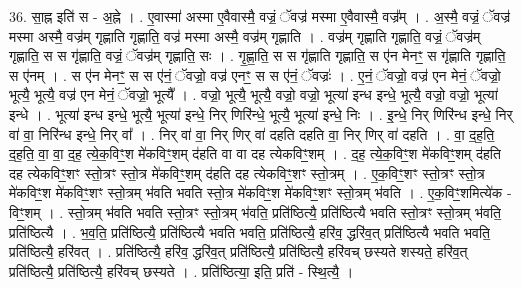 \documentclass[17pt]{extarticle}
\begin{document}
36. सा॒ह्न इति॑ स - अ॒ह्ने । . ए॒वास्मा॑ अस्मा ए॒वैवास्मै॒ वज्रं॒ ॅवज्र॑ मस्मा ए॒वैवास्मै॒ वज्र᳚म् । . अ॒स्मै॒ वज्रं॒ ॅवज्र॑ मस्मा अस्मै॒ वज्र॑म् गृह्णाति गृह्णाति॒ वज्र॑ मस्मा अस्मै॒ वज्र॑म् गृह्णाति । . वज्र॑म् गृह्णाति गृह्णाति॒ वज्रं॒ ॅवज्र॑म् गृह्णाति॒ स स गृ॑ह्णाति॒ वज्रं॒ ॅवज्र॑म् गृह्णाति॒ सः । . गृ॒ह्णा॒ति॒ स स गृ॑ह्णाति गृह्णाति॒ स ए॑न मेनꣳ॒॒ स गृ॑ह्णाति गृह्णाति॒ स ए॑नम् । . स ए॑न मेनꣳ॒॒ स स ए॑नं॒ ॅवज्रो॒ वज्र॑ एनꣳ॒॒ स स ए॑नं॒ ॅवज्रः॑ । . ए॒नं॒ ॅवज्रो॒ वज्र॑ एन मेनं॒ ॅवज्रो॒ भूत्यै॒ भूत्यै॒ वज्र॑ एन मेनं॒ ॅवज्रो॒ भूत्यै᳚ । . वज्रो॒ भूत्यै॒ भूत्यै॒ वज्रो॒ वज्रो॒ भूत्या॑ इन्ध इन्धे॒ भूत्यै॒ वज्रो॒ वज्रो॒ भूत्या॑ इन्धे । . भूत्या॑ इन्ध इन्धे॒ भूत्यै॒ भूत्या॑ इन्धे॒ निर् णिरि॑न्धे॒ भूत्यै॒ भूत्या॑ इन्धे॒ निः । . इ॒न्धे॒ निर् णिरि॑न्ध इन्धे॒ निर् वा॑ वा॒ निरि॑न्ध इन्धे॒ निर् वा᳚ । . निर् वा॑ वा॒ निर् णिर् वा॑ दहति दहति वा॒ निर् णिर् वा॑ दहति । . वा॒ द॒ह॒ति॒ द॒ह॒ति॒ वा॒ वा॒ द॒ह॒ त्ये॒क॒विꣳ॒॒श मे॑कविꣳ॒॒शम् द॑हति वा वा दह त्येकविꣳ॒॒शम् । . द॒ह॒ त्ये॒क॒विꣳ॒॒श मे॑कविꣳ॒॒शम् द॑हति दह त्येकविꣳ॒॒शꣳ स्तो॒त्रꣳ स्तो॒त्र मे॑कविꣳ॒॒शम् द॑हति दह त्येकविꣳ॒॒शꣳ स्तो॒त्रम् । . ए॒क॒विꣳ॒॒शꣳ स्तो॒त्रꣳ स्तो॒त्र मे॑कविꣳ॒॒श मे॑कविꣳ॒॒शꣳ स्तो॒त्रम् भ॑वति भवति स्तो॒त्र मे॑कविꣳ॒॒श मे॑कविꣳ॒॒शꣳ स्तो॒त्रम् भ॑वति । . ए॒क॒विꣳ॒॒शमित्ये॑क - विꣳ॒॒शम् । . स्तो॒त्रम् भ॑वति भवति स्तो॒त्रꣳ स्तो॒त्रम् भ॑वति॒ प्रति॑ष्ठित्यै॒ प्रति॑ष्ठित्यै भवति स्तो॒त्रꣳ स्तो॒त्रम् भ॑वति॒ प्रति॑ष्ठित्यै । . भ॒व॒ति॒ प्रति॑ष्ठित्यै॒ प्रति॑ष्ठित्यै भवति भवति॒ प्रति॑ष्ठित्यै॒ हरि॑व॒ द्धरि॑व॒त् प्रति॑ष्ठित्यै भवति भवति॒ प्रति॑ष्ठित्यै॒ हरि॑वत् । . प्रति॑ष्ठित्यै॒ हरि॑व॒ द्धरि॑व॒त् प्रति॑ष्ठित्यै॒ प्रति॑ष्ठित्यै॒ हरि॑वच् छस्यते शस्यते॒ हरि॑व॒त् प्रति॑ष्ठित्यै॒ प्रति॑ष्ठित्यै॒ हरि॑वच् छस्यते । . प्रति॑ष्ठित्या॒ इति॒ प्रति॑ - स्थि॒त्यै॒ । \newline
\end{document}
